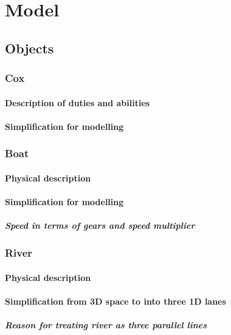 \chapter{Model}
  \section{Objects}
    \subsection{Cox}
      \subsubsection{Description of duties and abilities}
      \subsubsection{Simplification for modelling}
      
    \subsection{Boat}
      \subsubsection{Physical description}
      \subsubsection{Simplification for modelling}
        \paragraph{Speed in terms of gears and speed multiplier}
        
    \subsection{River}
      \subsubsection{Physical description}
      \subsubsection{Simplification from 3D space to into three 1D lanes}
        \paragraph{Reason for treating river as three parallel lines}
